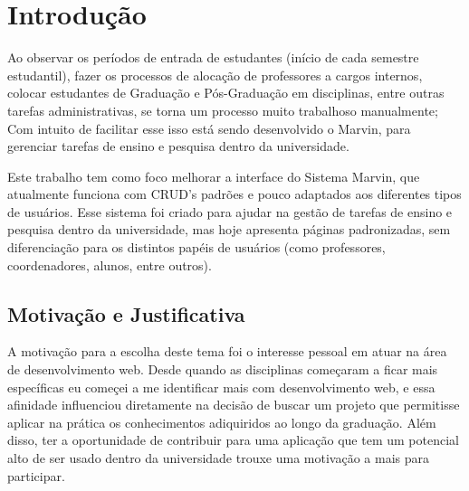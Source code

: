 \chapter{Introdução}
\label{sec-intro}




Ao observar os períodos de entrada de estudantes (início de cada semestre estudantil), fazer os processos de alocação de professores a cargos internos, colocar estudantes de Graduação e Pós-Graduação em disciplinas, entre outras tarefas administrativas, se torna um processo muito trabalhoso manualmente; Com intuito de facilitar esse isso está sendo desenvolvido o Marvin, para gerenciar tarefas de ensino e pesquisa dentro da universidade.

Este trabalho tem como foco melhorar a interface do Sistema Marvin, que atualmente funciona com CRUD's padrões e pouco adaptados aos diferentes tipos de usuários. Esse sistema foi criado para ajudar na gestão de tarefas de ensino e pesquisa dentro da universidade, mas hoje apresenta páginas padronizadas, sem diferenciação para os distintos papéis de usuários (como professores, coordenadores, alunos, entre outros).


\section{Motivação e Justificativa}
\label{sec-intro-motjus}


A motivação para a escolha deste tema foi o interesse pessoal em atuar na área de desenvolvimento web. Desde quando as disciplinas começaram a ficar mais específicas eu começei a me identificar mais com desenvolvimento web, e essa afinidade  influenciou diretamente na decisão de buscar um projeto que permitisse aplicar na prática os conhecimentos adiquiridos ao longo da graduação. Além disso, ter a oportunidade de contribuir para uma aplicação que tem um potencial alto de ser usado dentro da universidade trouxe uma motivação a mais para participar.

